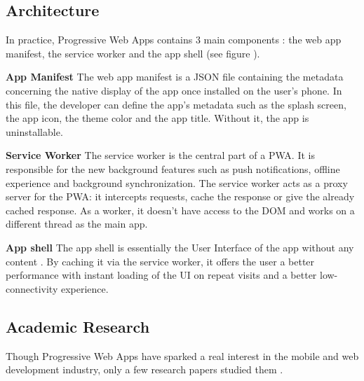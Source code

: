\documentclass{kththesis}
\begin{document}
\subsection{Architecture}

In practice, Progressive Web Apps contains 3 main components : the web app manifest, the service worker and the app shell (see figure ).

\medskip
\textbf{App Manifest} \newline
The web app manifest is a JSON file containing the metadata concerning the native display of the app once installed on the user's phone. In this file, the developer can define the app's metadata such as the splash screen, the app icon, the theme color and the app title. Without it, the app is uninstallable.

\medskip
\textbf{Service Worker} \newline
The service worker is the central part of a PWA. It is responsible for the new background features such as push notifications, offline experience and background synchronization\cite{SW_def}. The service worker acts as a proxy server for the PWA: it intercepts requests, cache the response or give the already cached response. As a worker, it doesn't have access to the DOM and works on a different thread as the main app. 

\medskip
\textbf{App shell} \newline
The app shell is essentially the User Interface of the app without any content \cite{AppShell_def}. By caching it via the service worker, it offers the user a better performance with instant loading of the UI on repeat visits and a better low-connectivity experience.


\subsection{Academic Research} 


Though Progressive Web Apps have sparked a real interest in the mobile and web development industry, only a few research papers studied them\cite{PWApossibleUnifer} \cite{Biorn-Hansen2} \cite{Biorn-Hansen3}.
\end{document}
